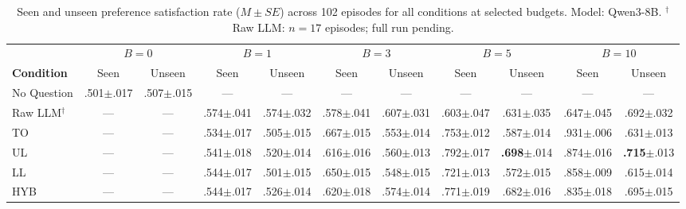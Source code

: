 \documentclass[manuscript,review,anonymous]{acmart}
\begin{document}
\begin{table}[h]
\centering
\caption{Seen and unseen preference satisfaction rate ($M \pm SE$) across 102 episodes for all conditions at selected budgets. Model: Qwen3-8B\@. $^\dagger$Raw LLM\@: $n=17$ episodes; full run pending.}
\label{tab:qwen3-results}
\begin{tabular}{l cc cc cc cc cc}
\toprule
 & \multicolumn{2}{c}{$B=0$} & \multicolumn{2}{c}{$B=1$} & \multicolumn{2}{c}{$B=3$} & \multicolumn{2}{c}{$B=5$} & \multicolumn{2}{c}{$B=10$} \\
\cmidrule(lr){2-3} \cmidrule(lr){4-5} \cmidrule(lr){6-7} \cmidrule(lr){8-9} \cmidrule(lr){10-11}
\textbf{Condition} & Seen & Unseen & Seen & Unseen & Seen & Unseen & Seen & Unseen & Seen & Unseen \\
\midrule
No Question      & .501{\scriptsize$\pm$.017} & .507{\scriptsize$\pm$.015} & --- & --- & --- & --- & --- & --- & --- & --- \\
Raw LLM$^\dagger$ & --- & --- & .574{\scriptsize$\pm$.041} & .574{\scriptsize$\pm$.032} & .578{\scriptsize$\pm$.041} & .607{\scriptsize$\pm$.031} & .603{\scriptsize$\pm$.047} & .631{\scriptsize$\pm$.035} & .647{\scriptsize$\pm$.045} & .692{\scriptsize$\pm$.032} \\
TO               & --- & --- & .534{\scriptsize$\pm$.017} & .505{\scriptsize$\pm$.015} & .667{\scriptsize$\pm$.015} & .553{\scriptsize$\pm$.014} & .753{\scriptsize$\pm$.012} & .587{\scriptsize$\pm$.014} & .931{\scriptsize$\pm$.006} & .631{\scriptsize$\pm$.013} \\
UL              & --- & --- & .541{\scriptsize$\pm$.018} & .520{\scriptsize$\pm$.014} & .616{\scriptsize$\pm$.016} & .560{\scriptsize$\pm$.013} & .792{\scriptsize$\pm$.017} & \textbf{.698}{\scriptsize$\pm$.014} & .874{\scriptsize$\pm$.016} & \textbf{.715}{\scriptsize$\pm$.013} \\
LL              & --- & --- & .544{\scriptsize$\pm$.017} & .501{\scriptsize$\pm$.015} & .650{\scriptsize$\pm$.015} & .548{\scriptsize$\pm$.015} & .721{\scriptsize$\pm$.013} & .572{\scriptsize$\pm$.015} & .858{\scriptsize$\pm$.009} & .615{\scriptsize$\pm$.014} \\
HYB              & --- & --- & .544{\scriptsize$\pm$.017} & .526{\scriptsize$\pm$.014} & .620{\scriptsize$\pm$.018} & .574{\scriptsize$\pm$.014} & .771{\scriptsize$\pm$.019} & .682{\scriptsize$\pm$.016} & .835{\scriptsize$\pm$.018} & .695{\scriptsize$\pm$.015} \\
\bottomrule
\end{tabular}
\end{table}
\end{document}
